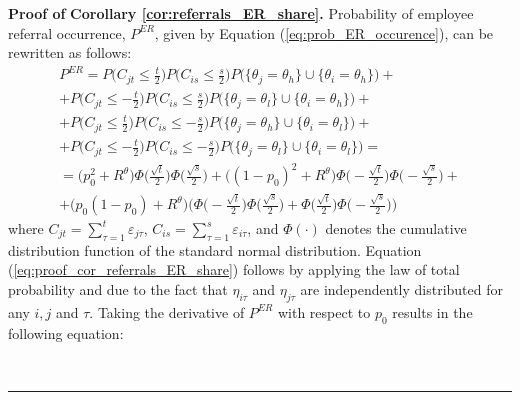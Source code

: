 \documentclass[12pt]{article}
\newenvironment{proof}[1][Proof of]{\noindent\textbf{#1} }{\ \rule{0.5em}{0.5em}}
\begin{document}
\begin{proof}
    \textbf{Corollary \ref{cor:referrals_ER_share}.}
    Probability of employee referral occurrence, $P^{ER}$, given by Equation (\ref{eq:prob_ER_occurence}), can be rewritten as follows:
    \begin{equation}\label{eq:proof_cor_referrals_ER_share}
        \begin{aligned}
            P^{ER} 
            =
            P\Big(C_{jt}\leq \frac{t}{2}\Big)
            P\Big(C_{is}\leq \frac{s}{2}\Big) 
            P\Big(\lbrace \theta_j = \theta_h \rbrace \cup \lbrace \theta_i = \theta_h\rbrace\Big)
            +\\
            +
            P\Big(C_{jt}\leq -\frac{t}{2}\Big) 
            P\Big(C_{is}\leq \frac{s}{2}\Big) 
            P\Big(\lbrace \theta_j = \theta_l \rbrace \cup \lbrace \theta_i = \theta_h\rbrace\Big)
            + \\
            +
            P\Big(C_{jt}\leq \frac{t}{2}\Big) 
            P\Big(C_{is}\leq -\frac{s}{2}\Big) 
            P\Big(\lbrace \theta_j = \theta_h \rbrace \cup \lbrace \theta_i = \theta_l\rbrace\Big)
            +\\
            +
            P\Big(C_{jt}\leq -\frac{t}{2}\Big) 
            P\Big(C_{is}\leq -\frac{s}{2}\Big) 
            P\Big(\lbrace \theta_j = \theta_l \rbrace \cup \lbrace \theta_i = \theta_l\rbrace\Big)
            =\\
            = 
            \Big(p_0^2 + R^\theta \Big)
            \Phi\bigg(\frac{\sqrt{t}}{2}\bigg)
            \Phi\bigg(\frac{\sqrt{s}}{2}\bigg)
            +
            \Big((1-p_0)^2 + R^\theta \Big)
            \Phi\bigg(-\frac{\sqrt{t}}{2}\bigg)
            \Phi\bigg(-\frac{\sqrt{s}}{2}\bigg)
            + \\
            +
            \Big(p_0(1-p_0) + R^\theta \Big)
            \Bigg(
                \Phi\bigg(-\frac{\sqrt{t}}{2}\bigg)
                \Phi\bigg(\frac{\sqrt{s}}{2}\bigg)
                +
                \Phi\bigg(\frac{\sqrt{t}}{2}\bigg)
                \Phi\bigg(-\frac{\sqrt{s}}{2}\bigg)
            \Bigg)  
        \end{aligned}
    \end{equation}
    where $C_{jt} = \sum_{\tau =1}^t \varepsilon_{j\tau}$, $C_{is} = \sum_{\tau =1}^s \varepsilon_{i\tau}$, and $\Phi(\cdot)$ denotes the cumulative distribution function of the standard normal distribution. Equation (\ref{eq:proof_cor_referrals_ER_share}) follows by applying the law of total probability and due to the fact that $\eta_{i\tau}$ and $\eta_{j\tau}$ are independently distributed for any $i,j$ and $\tau$. Taking the derivative of $P^{ER}$ with respect to $p_0$ results in the following equation:

\end{proof}
\end{document}
